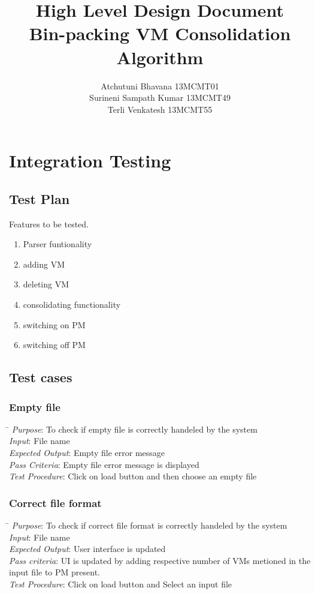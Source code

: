 \documentclass[a4paper,10pt]{article}
\title{High Level Design Document \\ Bin-packing VM Consolidation Algorithm}
\author{Atchutuni Bhavana 13MCMT01 \\ Surineni Sampath Kumar 13MCMT49 \\ Terli Venkatesh 13MCMT55}
\date{}
\begin{document}
\maketitle
\pagebreak
\tableofcontents
\pagebreak
\section{Integration Testing}
\subsection{Test Plan}
Features to be tested.
\begin{enumerate}
 \item Parser funtionality 
 \item adding VM
 \item deleting VM
 \item consolidating functionality 
 \item switching on PM
\item switching off PM
 \end{enumerate}
\subsection{Test cases}
\subsubsection{Empty file}
\begin{tabbing}
  \hspace*{4cm}\= \kill
\emph{Purpose}\>: To check if empty file is correctly handeled by the system\\
\emph{Input}\>: File name\\
\emph{Expected Output}\>: Empty file error message  \\
\emph{Pass Criteria}\>: Empty file error message is displayed\\
\emph{Test Procedure}\>: Click on load button and then choose an empty file\\
\end{tabbing}
\subsubsection{Correct file format}
\begin{tabbing}
 \hspace*{4cm}\= \kill
 \emph{Purpose}\>: To check if correct file format is correctly handeled by the system \\
 \emph{Input}\>: File name\\
 \emph{Expected Output}\>: User interface is updated\\
 \emph{Pass criteria}\>: UI is updated by adding respective number of VMs metioned in the \\ \>input file to PM present.\\
 \emph{Test Procedure}\>: Click on load button and Select an input file\\
 \end{tabbing}
\end{document}
